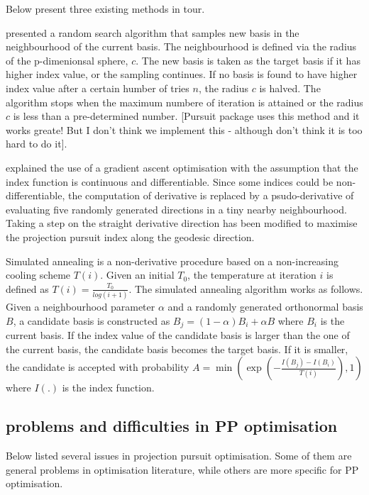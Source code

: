 \documentclass[12pt]{article}
\begin{document}
Below present three existing methods in tour.

\citet{posse1995projection} presented a random search algorithm that
samples new basis in the neighbourhood of the current basis. The
neighbourhood is defined via the radius of the p-dimenionsal sphere,
\(c\). The new basis is taken as the target basis if it has higher index
value, or the sampling continues. If no basis is found to have higher
index value after a certain humber of tries \(n\), the radius \(c\) is
halved. The algorithm stops when the maximum numbere of iteration is
attained or the radius \(c\) is less than a pre-determined number.
{[}Pursuit package uses this method and it works greate! But I don't
think we implement this - although don't think it is too hard to do
it{]}.

\citet{cook1995grand} explained the use of a gradient ascent
optimisation with the assumption that the index function is continuous
and differentiable. Since some indices could be non-differentiable, the
computation of derivative is replaced by a psudo-derivative of
evaluating five randomly generated directions in a tiny nearby
neighbourhood. Taking a step on the straight derivative direction has
been modified to maximise the projection pursuit index along the
geodesic direction.

Simulated annealing
\citep[\citet{kirkpatrick1983optimization}]{bertsimas1993simulated} is a
non-derivative procedure based on a non-increasing cooling scheme
\(T(i)\). Given an initial \(T_0\), the temperature at iteration \(i\)
is defined as \(T(i) = \frac{T_0}{log(i + 1)}\). The simulated annealing
algorithm works as follows. Given a neighbourhood parameter \(\alpha\)
and a randomly generated orthonormal basis \(B\), a candidate basis is
constructed as \(B_j = (1- \alpha)B_i + \alpha B\) where \(B_i\) is the
current basis. If the index value of the candidate basis is larger than
the one of the current basis, the candidate basis becomes the target
basis. If it is smaller, the candidate is accepted with probability
\(A = \min \left(\exp(-\frac{I(B_j) - I(B_i)}{T(i)}), 1 \right)\) where
\(I(.)\) is the index function.

\hypertarget{problems-and-difficulties-in-pp-optimisation}{%
\subsection{problems and difficulties in PP
optimisation}\label{problems-and-difficulties-in-pp-optimisation}}

Below listed several issues in projection pursuit optimisation. Some of
them are general problems in optimisation literature, while others are
more specific for PP optimisation.
\end{document}
